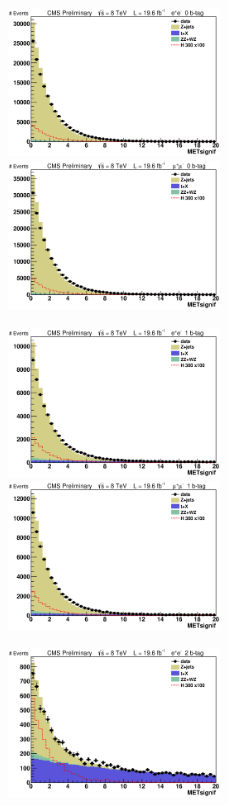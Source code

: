 \begin{figure}[htb!]
  \centerline{
    \includegraphics[width=0.5\textwidth]{presentation/defense/images/preselection/0/el/METsignif.eps}
    \includegraphics[width=0.5\textwidth]{presentation/defense/images/preselection/0/mu/METsignif.eps}
  }
\centerline{
    \includegraphics[width=0.5\textwidth]{presentation/defense/images/preselection/1/el/METsignif.eps}
    \includegraphics[width=0.5\textwidth]{presentation/defense/images/preselection/1/mu/METsignif.eps}
  }
\centerline{
    \includegraphics[width=0.5\textwidth]{presentation/defense/images/preselection/2/el/METsignif.eps}
}
\end{figure}
